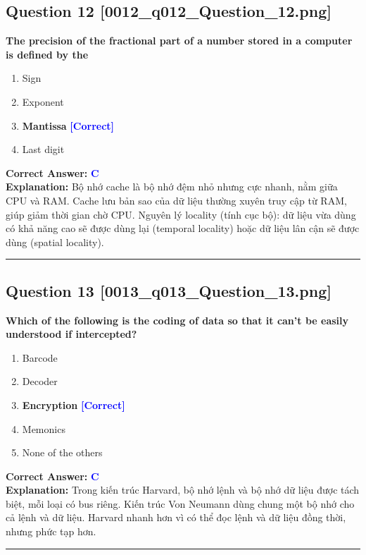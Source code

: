 \documentclass[11pt,a4paper]{article}
\begin{document}
\begin{minipage}{\textwidth}
\subsection*{Question 12 \quad \footnotesize{[0012\_q012\_Question\_12.png]}}
\noindent \textbf{The precision of the fractional part of a number stored in a computer is defined by the}

\begin{enumerate}[label=\Alph*.]
    \item Sign
    \item Exponent
    \item \textbf{Mantissa} \hfill \textcolor{blue}{\textbf{[Correct]}}
    \item Last digit
\end{enumerate}

\noindent \textbf{Correct Answer:} \textcolor{blue}{\textbf{C}} \\[2pt]
\noindent \textbf{Explanation:} Bộ nhớ cache là bộ nhớ đệm nhỏ nhưng cực nhanh, nằm giữa CPU và RAM. Cache lưu bản sao của dữ liệu thường xuyên truy cập từ RAM, giúp giảm thời gian chờ CPU. Nguyên lý locality (tính cục bộ): dữ liệu vừa dùng có khả năng cao sẽ được dùng lại (temporal locality) hoặc dữ liệu lân cận sẽ được dùng (spatial locality).

\par\vspace{0.3cm}
\hrule
\vspace{0.3cm}
\end{minipage}

\begin{minipage}{\textwidth}
\subsection*{Question 13 \quad \footnotesize{[0013\_q013\_Question\_13.png]}}
\noindent \textbf{Which of the following is the coding of data so that it can't be easily understood if intercepted?}

\begin{enumerate}[label=\Alph*.]
    \item Barcode
    \item Decoder
    \item \textbf{Encryption} \hfill \textcolor{blue}{\textbf{[Correct]}}
    \item Memonics
    \item None of the others
\end{enumerate}

\noindent \textbf{Correct Answer:} \textcolor{blue}{\textbf{C}} \\[2pt]
\noindent \textbf{Explanation:} Trong kiến trúc Harvard, bộ nhớ lệnh và bộ nhớ dữ liệu được tách biệt, mỗi loại có bus riêng. Kiến trúc Von Neumann dùng chung một bộ nhớ cho cả lệnh và dữ liệu. Harvard nhanh hơn vì có thể đọc lệnh và dữ liệu đồng thời, nhưng phức tạp hơn.

\par\vspace{0.3cm}
\hrule
\vspace{0.3cm}
\end{minipage}
\end{document}
